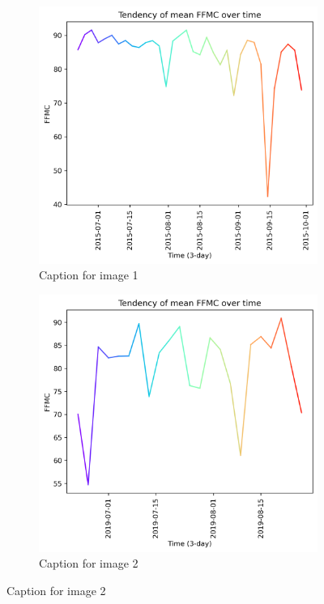 \begin{figure}[h]
	\caption{HELLo}
	\centering
	\begin{subfigure}{0.49\textwidth}
		\centering
		\includegraphics[width=\textwidth]{graphs/2015/tendency/2015_tendency_graph_FFMC.png}
		\caption{Caption for image 1}
		\label{fig:img1}
	\end{subfigure}
	\hfill
	\begin{subfigure}{0.49\textwidth}
		\centering
		\includegraphics[width=\textwidth]{graphs/2019/tendency/2019_tendency_graph_FFMC.png}
		\caption{Caption for image 2}
		\label{fig:img2}
	\end{subfigure}
	\label{fig:both_images}
\end{figure}

